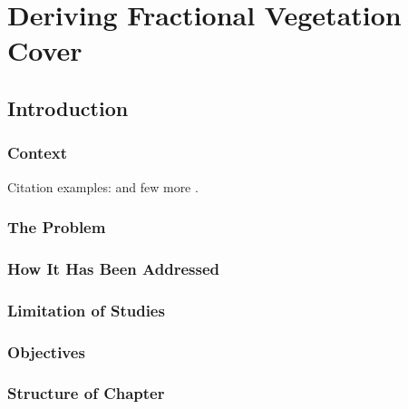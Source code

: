 \chapter{Deriving Fractional Vegetation Cover}\label{cha:introduction2}
\section{Introduction}\label{cha:introduction}
\subsection{Context}\label{sec:context}

Citation examples: \citet{adamMultispectralHyperspectralRemote2010} and few more \citep{alvarez-vanhardCanUAVsFill2020,annalaChlorophyllConcentrationRetrieval2020}.

\subsection{The Problem}\label{sec:problem}


\subsection{How It Has Been Addressed}\label{sec:addresed}


\subsection{Limitation of Studies}\label{sec:limitations}


\subsection{Objectives}\label{sec:objectives}


\subsection{Structure of Chapter}\label{sec:structure}


